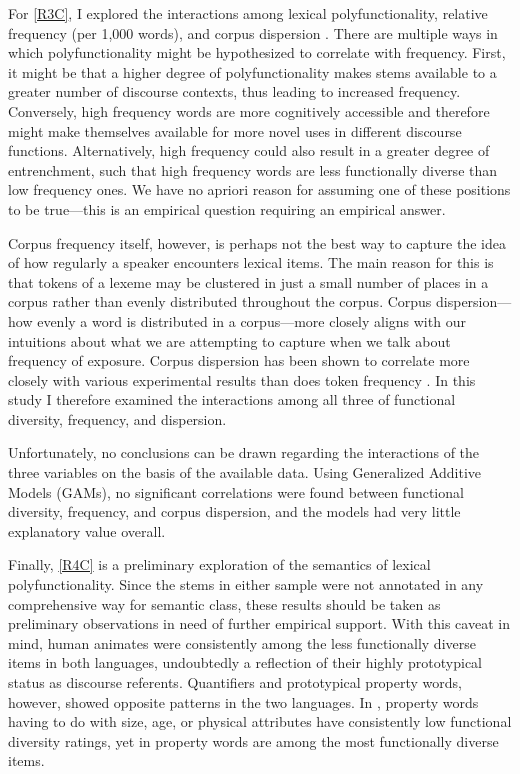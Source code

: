 For \ref{R3C}, I explored the interactions among lexical polyfunctionality, relative frequency (per 1,000 words), and corpus dispersion . There are multiple ways in which polyfunctionality might be hypothesized to correlate with frequency. First, it might be that a higher degree of polyfunctionality makes stems available to a greater number of discourse contexts, thus leading to increased frequency. Conversely, high frequency words are more cognitively accessible and therefore might make themselves available for more novel uses in different discourse functions. Alternatively, high frequency could also result in a greater degree of entrenchment, such that high frequency words are less functionally diverse than low frequency ones. We have no apriori reason for assuming one of these positions to be true—this is an empirical question requiring an empirical answer.

Corpus frequency itself, however, is perhaps not the best way to capture the idea of how regularly a speaker encounters lexical items. The main reason for this is that tokens of a lexeme may be clustered in just a small number of places in a corpus rather than evenly distributed throughout the corpus. Corpus dispersion—how evenly a word is distributed in a corpus—more closely aligns with our intuitions about what we are attempting to capture when we talk about frequency of exposure. Corpus dispersion has been shown to correlate more closely with various experimental results than does token frequency \parencites{Gries2008}{Gries2010}{Griesfc}. In this study I therefore examined the interactions among all three of functional diversity, frequency, and dispersion.

Unfortunately, no conclusions can be drawn regarding the interactions of the three variables on the basis of the available data. Using Generalized Additive Models (GAMs), no significant correlations were found between functional diversity, frequency, and corpus dispersion, and the models had very little explanatory value overall.

Finally, \ref{R4C} is a preliminary exploration of the semantics of lexical polyfunctionality. Since the stems in either sample were not annotated in any comprehensive way for semantic class, these results should be taken as preliminary observations in need of further empirical support. With this caveat in mind, human animates were consistently among the less functionally diverse items in both languages, undoubtedly a reflection of their highly prototypical status as discourse referents. Quantifiers and prototypical property words, however, showed opposite patterns in the two languages. In , property words having to do with size, age, or physical attributes have consistently low functional diversity ratings, yet in  property words are among the most functionally diverse items.

